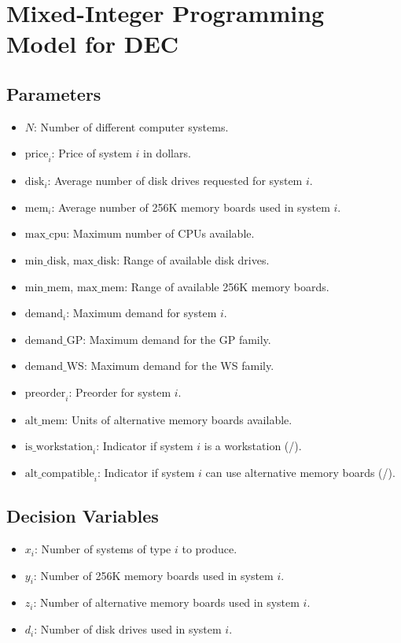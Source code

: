 \documentclass{article}
\begin{document}
\section*{Mixed-Integer Programming Model for DEC}

\subsection*{Parameters}
\begin{itemize}
    \item $N$: Number of different computer systems.
    \item $\text{price}_i$: Price of system $i$ in dollars.
    \item $\text{disk}_i$: Average number of disk drives requested for system $i$.
    \item $\text{mem}_i$: Average number of 256K memory boards used in system $i$.
    \item $\text{max\_cpu}$: Maximum number of CPUs available.
    \item $\text{min\_disk}$, $\text{max\_disk}$: Range of available disk drives.
    \item $\text{min\_mem}$, $\text{max\_mem}$: Range of available 256K memory boards.
    \item $\text{demand}_i$: Maximum demand for system $i$.
    \item $\text{demand\_GP}$: Maximum demand for the GP family.
    \item $\text{demand\_WS}$: Maximum demand for the WS family.
    \item $\text{preorder}_i$: Preorder for system $i$.
    \item $\text{alt\_mem}$: Units of alternative memory boards available.
    \item $\text{is\_workstation}_i$: Indicator if system $i$ is a workstation (/).
    \item $\text{alt\_compatible}_i$: Indicator if system $i$ can use alternative memory boards (/).
\end{itemize}

\subsection*{Decision Variables}
\begin{itemize}
    \item $x_i$: Number of systems of type $i$ to produce.
    \item $y_i$: Number of 256K memory boards used in system $i$.
    \item $z_i$: Number of alternative memory boards used in system $i$.
    \item $d_i$: Number of disk drives used in system $i$.
\end{itemize}
\end{document}
